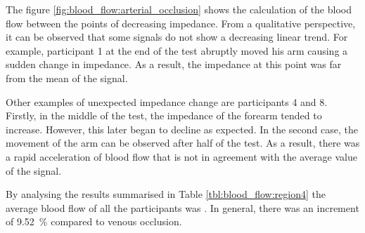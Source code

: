 The figure \ref{fig:blood_flow:arterial_occlusion} shows the calculation of the blood flow between the points of decreasing impedance. From a qualitative perspective, it can be observed that some signals do not show a decreasing linear trend. For example, participant 1 at the end of the test abruptly moved his arm causing a sudden change in impedance. As a result, the impedance at this point was far from the mean of the signal.

Other examples of unexpected impedance change are participants 4 and 8. Firstly, in the middle of the test, the impedance of the forearm tended to increase. However, this later began to decline as expected. In the second case, the movement of the arm can be observed after half of the test. As a result, there was a rapid acceleration of blood flow that is not in agreement with the average value of the signal.

By analysing the results summarised in Table \ref{tbl:blood_flow:region4} the average blood flow of all the participants was \flowbasalarterial{}. In general, there was an increment of \SI{9.52}{\percent} compared to venous occlusion. 


